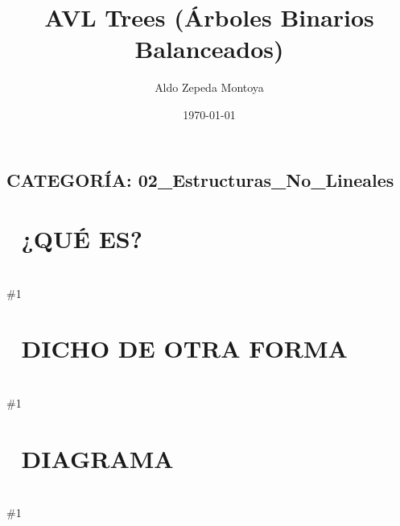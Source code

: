 \documentclass{article}
\newcommand{\quees}[1]{
    \section*{🤔 ¿QUÉ ES?}
    \hrulefill \\
    \#1
}
\newcommand{\dichodeotraforma}[1]{
    \section*{💬 DICHO DE OTRA FORMA}
    \hrulefill \\
    \#1
}
\newcommand{\diagrama}[1]{
    \section*{🎨 DIAGRAMA}
    \hrulefill \\
    \#1
}
\begin{document}
\title{AVL Trees (Árboles Binarios Balanceados)}
\author{Aldo Zepeda Montoya}
\date{\today}
\maketitle

\subsection*{CATEGORÍA: 02\_Estructuras\_No\_Lineales}

\quees{
Un móvil de bebé 👶. Si pones mucho peso de un lado, el móvil se
inclina y queda chueco. Para que funcione bien, debes mover las piezas
hasta que quede perfectamente equilibrado.

Un árbol AVL es un Binary Search Tree (BST) que tiene una "manía"
por el orden: no permite que una rama sea mucho más larga que otra. 
Si al insertar un número el árbol se desbalancea, el árbol se 
"tuerce" a sí mismo (rotación) para volver al equilibrio.
}

\dichodeotraforma{
El AVL es el primer árbol auto-balanceable de la historia. Su regla
es estricta: para cada nodo, la diferencia de altura entre su hijo
izquierdo y derecho (llamada Balance Factor) solo puede ser -1, 0 o 1.

Si la diferencia es 2 o -2, el árbol realiza rotaciones (Simples o 
Dobles) para restaurar el balance. Esto garantiza que la altura del
árbol sea siempre O(log n), evitando el peor caso de los BST normales.
}

\diagrama{\begin{verbatim}
Rotación Simple a la Derecha (LL Rotation):

      [3] (BF=+2)              [2] (BF=0)
     /                        /   \
   [2]          ----->      [1]    [3]
  /
[1]

Rotación Doble (LR Rotation):

    [3] (BF=+2)         [3]                 [2]
   /                   /                   /   \
 [1] (BF=-1)  --->   [2]      --->       [1]    [3]
   \                /
   [2]            [1]
\end{verbatim}}
\end{document}
